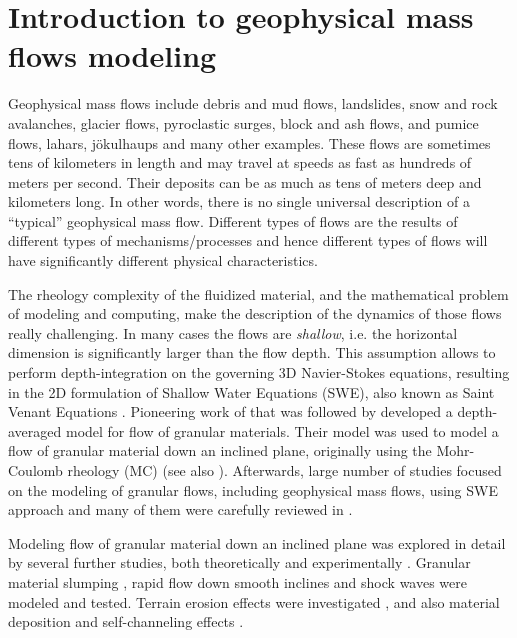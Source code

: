 \documentclass{article}
\begin{document}
\newpage
\section{Introduction to geophysical mass flows modeling}\label{subsec:FlowTypes}
Geophysical mass flows include debris and mud flows, landslides, snow and rock avalanches, glacier flows, pyroclastic surges, block and ash flows, and pumice flows, lahars, j\"okulhaups and many other examples. These flows are sometimes tens of kilometers in length and may travel at speeds as fast as hundreds of meters per second. Their deposits can be as much as tens of meters deep and kilometers long. In other words, there is no single universal description of a ``typical'' geophysical mass flow. Different types of flows are the results of different types of mechanisms/processes and hence different types of flows will have significantly different physical characteristics.

The rheology complexity of the fluidized material, and the mathematical problem of modeling and computing, make the description of the dynamics of those flows really challenging. In many cases the flows are \emph{shallow}, i.e. the horizontal dimension is significantly larger than the flow depth. This assumption allows to perform depth-integration on the governing 3D Navier-Stokes equations, resulting in the 2D formulation of Shallow Water Equations (SWE), also known as Saint Venant Equations \citep{Batchelor2000, Luca2016}. Pioneering work of \cite{SavageHutter1989} that was followed by \cite{Hutter1993,DadeHuppert1998} developed a depth-averaged model for flow of granular materials. Their model was used to model a flow of granular material down an inclined plane, originally using the Mohr-Coulomb rheology (MC) (see also \cite{Jaeger1989,FraccarolloToro1995}). Afterwards, large number of studies focused on the modeling of granular flows, including geophysical mass flows, using SWE approach and many of them were carefully reviewed in \cite{PudasainiHutter2007}.

Modeling flow of granular material down an inclined plane was explored in detail by several further studies, both theoretically and experimentally \citep{Pouliquen1999, RuyerQuil2000, Silbert2001, Bursik2005, DaCruz2005}. Granular material slumping \citep{Balmforth2005,Lajeunesse2005}, rapid flow down smooth inclines \citep{Greve1994,Wieland1999} and shock waves \citep{Gray2003,Hokanardottir2005} were modeled and tested. Terrain erosion effects were investigated \citep{Pitman2003b, Edwards2015}, and also material deposition and self-channeling effects \citep{Mangeney2005, Mangeney2007}.
\end{document}
